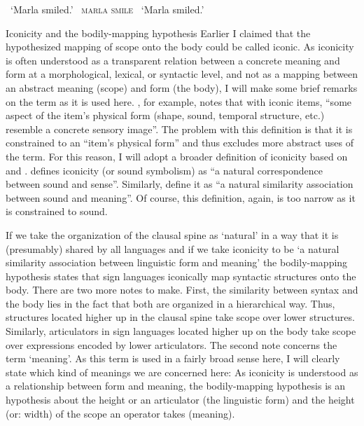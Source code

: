 \begin{exe}
\ex\label{smilingexample}\begin{xlist} 
\ex {} \slg[smile]{\textcolor{white}{smile}}
\glt \textcolor{white}{*}`Marla smiled.' \label{ex:smilingexamplea}
\ex \textcolor{white}{*}\textsc{marla smile}  
\glt \textcolor{white}{*}`Marla smiled.' \label{ex:smilingexampleb}
\end{xlist}
\end{exe} 
%

\begin{digression}{Iconicity and the bodily-mapping hypothesis}{}\label{iconicity}
\noindent Earlier I claimed that the hypothesized mapping of scope onto the body could be called iconic. As iconicity is often understood as a transparent relation between a concrete meaning and form at a morphological, lexical, or syntactic level, and not as a mapping between an abstract meaning (scope) and form (the body), I will make some brief remarks on the term as it is used here. \citet[20]{taub2004iconicity}, for example, notes that with iconic items, ``some aspect of the item's physical form (shape, sound, temporal structure, etc.) resemble a concrete sensory image''. The problem with this definition is that it is constrained to an ``item's physical form'' and thus excludes more abstract uses of the term. For this reason, I will adopt a broader definition of iconicity based on \citet{jespersen1922language} and \citet{jakobsonwaugh1979soundshape}. \citet[396]{jespersen1922language} defines iconicity (or sound symbolism)  as ``a natural correspondence between sound and sense''. Similarly, \citet[178]{jakobsonwaugh1979soundshape} define it as ``a natural similarity association between sound and meaning''. Of course, this definition, again, is too narrow as it is constrained to sound. 

If we take the organization of the clausal spine as `natural' in a way that it is (presumably) shared by all languages and if we take iconicity to be `a natural similarity association between linguistic form and meaning' the bodily-mapping hypothesis states that sign languages iconically map syntactic structures onto the body. There are two more notes to make. First, the similarity between syntax and the body lies in the fact that both are organized in a hierarchical way. Thus, structures located higher up in the clausal spine take scope over lower structures. Similarly, articulators in sign languages located higher up on the body take scope over expressions encoded by lower articulators. The second note concerns the term `meaning'. As this term is used in a fairly broad sense here, I will clearly state which kind of meanings we are concerned here: As iconicity is understood as a relationship between form and meaning, the bodily-mapping hypothesis is an hypothesis about the height or an articulator (the linguistic form) and the height (or: width) of the scope an operator takes (meaning).


\end{digression}
